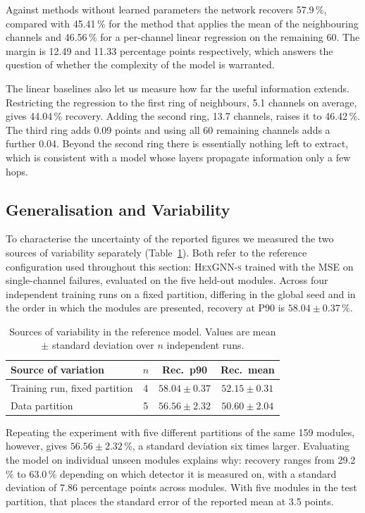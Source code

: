 \documentclass[10pt,conference]{IEEEtran}
\begin{document}
Against methods without learned parameters the network recovers 57.9\,\%,
compared with 45.41\,\% for the method that applies the mean of the neighbouring channels and
46.56\,\% for a per-channel linear regression on the remaining 60. The margin
is 12.49 and 11.33 percentage points respectively, which answers the question
of whether the complexity of the model is warranted.

The linear baselines also let us measure how far the useful information
extends. Restricting the regression to the first ring of neighbours, 5.1
channels on average, gives 44.04\,\% recovery. Adding the second ring, 13.7
channels, raises it to 46.42\,\%. The third ring adds 0.09 points and using all
60 remaining channels adds a further 0.04. Beyond the second ring there is
essentially nothing left to extract, which is consistent with a model whose
layers propagate information only a few hops.

\subsection{Generalisation and Variability}
\label{sec:res-variability}
To characterise the uncertainty of the reported figures we measured the two
sources of variability separately (Table~\ref{tab:reference}). Both refer to
the reference configuration used throughout this section: \textsc{HexGNN-s}
trained with the MSE on single-channel failures, evaluated on the five held-out
modules. Across four independent training runs on a fixed partition, differing
in the global seed and in the order in which the modules are presented,
recovery at P90 is $58.04 \pm 0.37$\,\%.

\begin{table}[t]
\centering
\caption{Sources of variability in the reference model. Values are
mean $\pm$ standard deviation over $n$ independent runs.}
\label{tab:reference}
\begin{tabular}{@{}lccc@{}}
\toprule
\textbf{Source of variation} & \textbf{$n$} & \textbf{Rec.\ p90} & \textbf{Rec.\ mean} \\
\midrule
Training run, fixed partition & 4 & $58.04 \pm 0.37$ & $52.15 \pm 0.31$ \\
Data partition                & 5 & $56.56 \pm 2.32$ & $50.60 \pm 2.04$ \\
\bottomrule
\end{tabular}
\end{table}
Repeating the experiment with five different partitions of the same 159
modules, however, gives $56.56 \pm 2.32$\,\%, a standard deviation six times
larger. Evaluating the model on individual unseen modules explains why:
recovery ranges from
29.2\,\% to 63.0\,\% depending on which detector it is measured on, with a
standard deviation of 7.86 percentage points across modules. With five modules
in the test partition, that places the standard error of the reported mean at
3.5 points.
\end{document}
